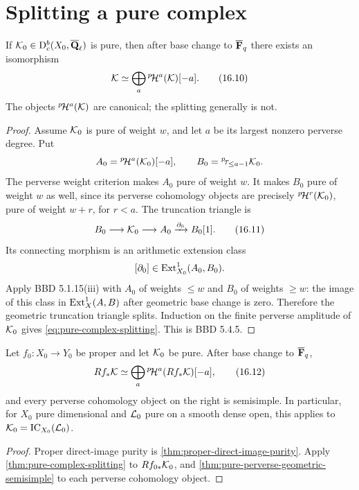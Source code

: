 \section{Splitting a pure complex}

\begin{theorem}
\label{thm:pure-complex-splitting}
If \(\mathcal K_0\in\mathrm D^b_c(X_0,\overline{\mathbf Q}_\ell)\) is pure, then after base change to \(\overline{\mathbf F}_q\)
there exists an isomorphism
\[
  \mathcal K\simeq\bigoplus_a{}^{p}\!\mathcal H^a(\mathcal K)[-a].
\tag{16.10}\label{eq:pure-complex-splitting}
\]
The objects \({}^{p}\!\mathcal H^a(\mathcal K)\) are canonical; the splitting generally is not.
\end{theorem}

\begin{proof}
Assume \(\mathcal K_0\) is pure of weight \(w\), and let \(a\) be its largest
nonzero perverse degree.  Put
\[
 A_0={}^{p}\!\mathcal H^a(\mathcal K_0)[-a],
 \qquad
 B_0={}^{p}\!\tau_{\leq a-1}\mathcal K_0.
\]
The perverse weight criterion makes \(A_0\) pure of weight \(w\).  It makes
\(B_0\) pure of weight \(w\) as well, since its perverse cohomology objects
are precisely \({}^{p}\!\mathcal H^r(\mathcal K_0)\), pure of weight \(w+r\), for \(r<a\).
The truncation triangle is
\[
 B_0\longrightarrow\mathcal K_0\longrightarrow A_0
 \xrightarrow{\partial_0}B_0[1].
\tag{16.11}\label{eq:perverse-truncation-obstruction}
\]
Its connecting morphism is an arithmetic extension class
\[
 [\partial_0]\in\operatorname{Ext}^1_{X_0}(A_0,B_0).
\]
Apply BBD 5.1.15(iii) with \(A_0\) of weights \(\leq w\) and \(B_0\) of
weights \(\geq w\): the image of this class in
\(\operatorname{Ext}^1_X(A,B)\) after geometric base change is zero.  Therefore the
geometric truncation triangle splits.  Induction on the finite perverse
amplitude of \(\mathcal K_0\) gives \eqref{eq:pure-complex-splitting}.  This is
BBD 5.4.5.
\end{proof}

\begin{theorem}
\label{thm:decomposition-finite-field}
Let \(f_0:X_0\to Y_0\) be proper and let \(\mathcal K_0\) be pure.  After base change
to \(\overline{\mathbf F}_q\),
\[
  Rf_*\mathcal K\simeq
  \bigoplus_a {}^{p}\!\mathcal H^a(Rf_*\mathcal K)[-a],
\tag{16.12}\label{eq:decomposition-theorem}
\]
and every perverse cohomology object on the right is semisimple.
In particular, for \(X_0\) pure dimensional and \(\mathcal L_0\) pure on a smooth
dense open, this applies to \(\mathcal K_0=\operatorname{IC}_{X_0}(\mathcal L_0)\).
\end{theorem}

\begin{proof}
Proper direct-image purity is
\cref{thm:proper-direct-image-purity}.  Apply
\cref{thm:pure-complex-splitting} to \(Rf_{0*}\mathcal K_0\), and
\cref{thm:pure-perverse-geometric-semisimple} to each perverse cohomology
object.
\end{proof}

